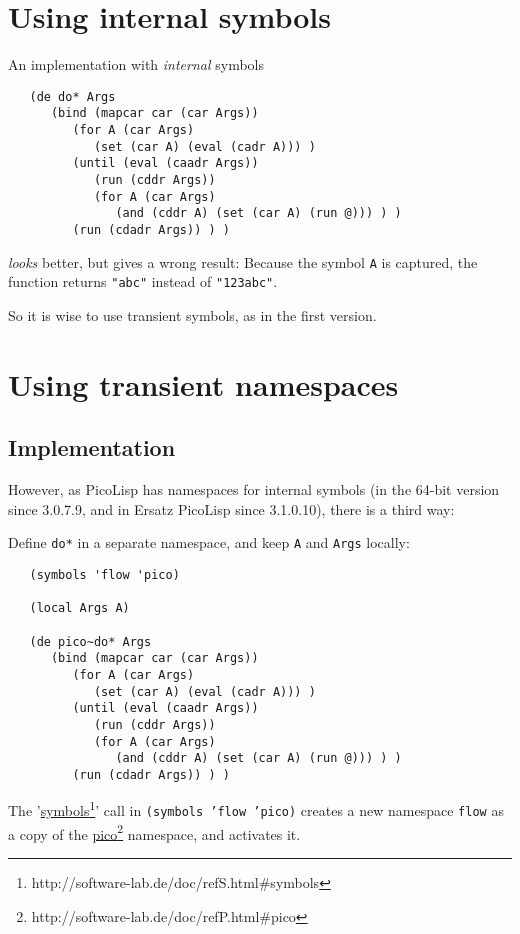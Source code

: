 \section{Using internal symbols}
\label{sec:transient-namespaces-using-internal-symbols}

An implementation with \textit{internal} symbols
\begin{verbatim}
   (de do* Args
      (bind (mapcar car (car Args))
         (for A (car Args)
            (set (car A) (eval (cadr A))) )
         (until (eval (caadr Args))
            (run (cddr Args))
            (for A (car Args)
               (and (cddr A) (set (car A) (run @))) ) )
         (run (cdadr Args)) ) )
\end{verbatim}

\textit{looks} better, but gives a wrong result: Because the symbol \texttt{A} is captured,
the function returns \texttt{"abc"} instead of \texttt{"123abc"}.

So it is wise to use transient symbols, as in the first version.

\section{Using transient namespaces}
\label{sec:transient-namespaces-using-transient-namespaces}


\subsection{Implementation}
\label{sec:transient-namespaces-implementation}

However, as PicoLisp has namespaces for internal symbols (in the 64-bit version
since 3.0.7.9, and in Ersatz PicoLisp since 3.1.0.10), there is a third way:

Define \texttt{do*} in a separate namespace, and keep \texttt{A} and \texttt{Args} locally:
\begin{verbatim}
   (symbols 'flow 'pico)

   (local Args A)

   (de pico~do* Args
      (bind (mapcar car (car Args))
         (for A (car Args)
            (set (car A) (eval (cadr A))) )
         (until (eval (caadr Args))
            (run (cddr Args))
            (for A (car Args)
               (and (cddr A) (set (car A) (run @))) ) )
         (run (cdadr Args)) ) )
\end{verbatim}

The '\underline{symbols}\footnote{http://software-lab.de/doc/refS.html\#symbols}' call in \texttt{(symbols
'flow 'pico)} creates a new namespace \texttt{flow} as a copy of the
\underline{pico}\footnote{http://software-lab.de/doc/refP.html\#pico} namespace, and activates it.

